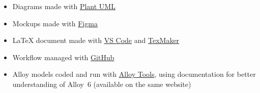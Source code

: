 \begin{itemize}
	\item Diagrams made with \href{https://plantuml.online}{Plant UML}
	\item Mockups made with \href{https://www.figma.com/}{Figma}
	\item LaTeX document made with \href{https://code.visualstudio.com/}{VS Code} and \href{https://www.xm1math.net/texmaker/}{TexMaker}
	\item Workflow managed with \href{https://github.com/}{GitHub}
	\item Alloy models coded and run with \href{https://alloytools.org/}{Alloy Tools}, using documentation for better understanding of Alloy~6 (available on the same website)
\end{itemize}